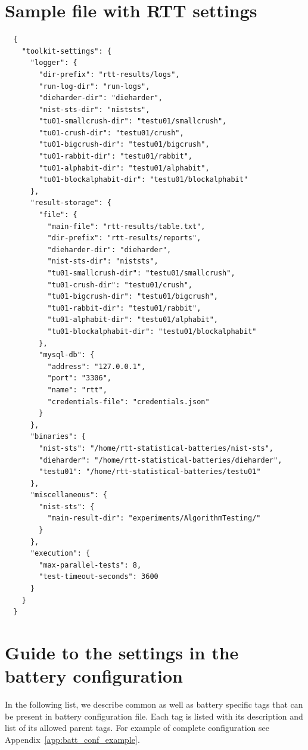 \documentclass[
	digital,    %
	oneside,
	color,
	11pt,
	nocover,
	notable,
	nolof,
	nolot,
]{fithesis3}
\theoremstyle{definition}
\theoremstyle{remark}
\begin{document}
\chapter{Sample file with RTT settings}
\label{app:rtt_sett_json}
\begin{verbatim}
  {
    "toolkit-settings": {
      "logger": {
        "dir-prefix": "rtt-results/logs",
        "run-log-dir": "run-logs",
        "dieharder-dir": "dieharder",
        "nist-sts-dir": "niststs",
        "tu01-smallcrush-dir": "testu01/smallcrush",
        "tu01-crush-dir": "testu01/crush",
        "tu01-bigcrush-dir": "testu01/bigcrush",
        "tu01-rabbit-dir": "testu01/rabbit",
        "tu01-alphabit-dir": "testu01/alphabit",
        "tu01-blockalphabit-dir": "testu01/blockalphabit"
      },
      "result-storage": {
        "file": {
          "main-file": "rtt-results/table.txt",
          "dir-prefix": "rtt-results/reports",
          "dieharder-dir": "dieharder",
          "nist-sts-dir": "niststs",
          "tu01-smallcrush-dir": "testu01/smallcrush",
          "tu01-crush-dir": "testu01/crush",
          "tu01-bigcrush-dir": "testu01/bigcrush",
          "tu01-rabbit-dir": "testu01/rabbit",
          "tu01-alphabit-dir": "testu01/alphabit",
          "tu01-blockalphabit-dir": "testu01/blockalphabit"
        },
        "mysql-db": {
          "address": "127.0.0.1",
          "port": "3306",
          "name": "rtt",
          "credentials-file": "credentials.json"
        }
      },
      "binaries": {
        "nist-sts": "/home/rtt-statistical-batteries/nist-sts",
        "dieharder": "/home/rtt-statistical-batteries/dieharder",
        "testu01": "/home/rtt-statistical-batteries/testu01"
      },
      "miscellaneous": {
        "nist-sts": {
          "main-result-dir": "experiments/AlgorithmTesting/"
        }
      },
      "execution": {
        "max-parallel-tests": 8,
        "test-timeout-seconds": 3600
      }
    }
  }
\end{verbatim}

\chapter{Guide to the settings in the battery configuration}
\label{app:batt_conf_guide}
In the following list, we describe common as well as battery specific tags that can be present in battery configuration file. Each tag is listed with its description and list of its allowed parent tags. For example of complete configuration see Appendix~\ref{app:batt_conf_example}.
\end{document}
